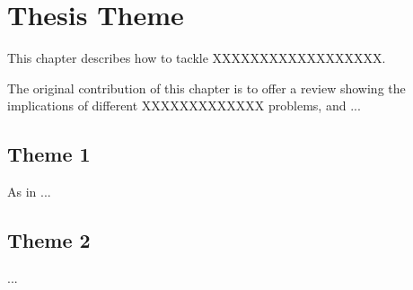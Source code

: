
\inbpdocument

\chapter{Thesis Theme}
\label{ch:corrIntro}


This chapter describes how to tackle XXXXXXXXXXXXXXXXXX.

The original contribution of this chapter is to offer a review showing the implications of different XXXXXXXXXXXXX problems, and ...

\section{Theme 1}
As  in \citep{article}...
\section{Theme 2}
...




\outbpdocument{}
